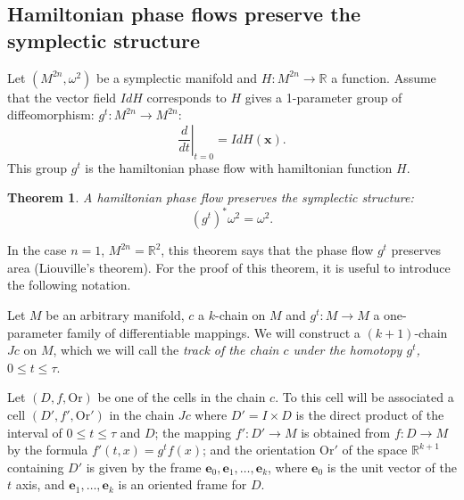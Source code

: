 \documentclass{book}
\numberwithin{equation}{section}
\theoremstyle{plain}
\newtheorem{thm}{Theorem}[section]
\theoremstyle{definition}
\theoremstyle{remark}
\theoremstyle{remark}
\begin{document}
\subsection{Hamiltonian phase flows preserve the symplectic structure}

Let $(M^{2n}, \omega^2)$ be a symplectic manifold and
$H: M^{2n} \rightarrow \mathbb{R}$ a function.
Assume that the vector field $IdH$
corresponds to $H$ gives a 1-parameter group
of diffeomorphism: $g^t: M^{2n} \rightarrow M^{2n}$:
$$
\left.\frac{d}{dt}\right|_{t = 0}
= I dH(\mathbf x).
$$
This group $g^t$ is the hamiltonian phase flow with
hamiltonian function $H$.


\begin{thm}
A hamiltonian phase flow preserves the symplectic structure:
$$
(g^t)^* \omega^2 = \omega^2.
$$
\end{thm}



In the case $n = 1$, $M^{2n} = \mathbb{R}^2$, this theorem says
that the phase flow $g^t$ preserves area (Liouville's theorem).
%
For the proof of this theorem, it is useful to introduce
the following notation.

Let $M$ be an arbitrary manifold,
$c$ a $k$-chain on $M$ and $g^t: M \rightarrow M$
a one-parameter family of differentiable mappings.
We will construct a $(k+1)$-chain $Jc$ on $M$,
which we will call the
\emph{track of the chain $c$ under the homotopy
$g^t$, $0 \le t \le \tau$}.


Let $(D, f, \mathrm{Or})$ be one of the cells in the chain $c$.
%
To this cell will be associated a cell $(D', f', \mathrm{Or}')$
  in the chain $Jc$ where $D' = I\times D$ is the direct product
  of the interval of $0 \le t \le \tau$ and $D$;
  the mapping $f': D' \rightarrow M$ is obtained from
  $f: D \rightarrow M$ by the formula
  $f'(t, x) = g^t f(x)$;
  and the orientation $\mathrm{Or}'$ of the space $\mathbb{R}^{k+1}$
  containing $D'$ is given by the frame
  $\mathbf e_0, \mathbf e_1, \dots, \mathbf e_k$,
  where $\mathbf e_0$ is the unit vector of the $t$ axis,
  and $\mathbf e_1, \dots, \mathbf e_k$ is an oriented frame for $D$.
\end{document}

